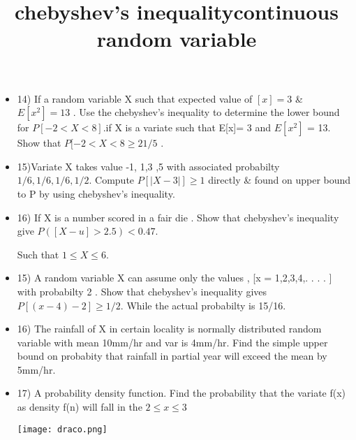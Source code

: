 \documentclass{article}
\begin{document}
\title{\Large chebyshev's inequality}

\begin{itemize}

    
    \item 14) If a random variable X such that expected value of $[x]= 3$  & $E[x^2]= 13$ . Use the chebyshev's inequality to determine the lower bound for $P[ -2 < X < 8]$.if X is a variate such that E[x]= 3 and $E[x^2]$ = 13. Show that $P[-2 < X < 8 \geq 21/5$ . 

    \item 15)Variate X takes value -1, 1,3 ,5 with associated probabilty 
    $1/6, 1/6, 1/6, 1/2$. Compute $P[|X-3|] \geq 1$ directly & found on upper bound to P by using chebyshev's inequality.

    \item 16) If X is a number scored in a fair die . Show that chebyshev's inequality give $P([X-u] > 2.5) < 0.47$.

   Such that $1 \leq X \leq 6$.

   \item 15) A random variable X can assume only the values , [x = 1,2,3,4,. . . . ] with probabilty 2 . Show that chebyshev's inequality gives $P[(x-4)-2] \geq 1/2$. While the actual probabilty is 15/16. 

   \item  16) The rainfall of X in certain locality is normally distributed random variable with mean 10mm/hr and var is 4mm/hr. Find the simple upper bound on probabity that rainfall in partial year will exceed the mean by 5mm/hr.
\end{itemize}

\title{\Large continuous random variable}
\begin{itemize}
    \item 17)  A probability density function. Find the probability that the variate f(x) as density f(n) will fall in the $2 \leq x \leq 3 $
    
    \texttt{[image: draco.png]}
\end{itemize}
\end{document}
